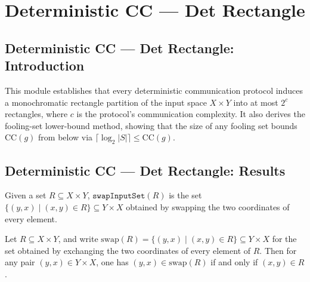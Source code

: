\section{Deterministic CC --- Det Rectangle}
\subsection*{Deterministic CC --- Det Rectangle: Introduction}

This module establishes that every deterministic communication protocol induces a
monochromatic rectangle partition of the input space $X \times Y$ into at most
$2^c$ rectangles, where $c$ is the protocol's communication complexity.
It also derives the fooling-set lower-bound method, showing that the size of any
fooling set bounds $\mathrm{CC}(g)$ from below via $\lceil \log_2 |S| \rceil \leq \mathrm{CC}(g)$.

\subsection*{Deterministic CC --- Det Rectangle: Results}

\begin{definition}
\label{CommunicationComplexity.Deterministic.Protocol.swapInputSet}
\leanok
Given a set $R \subseteq X \times Y$, $\texttt{swapInputSet}(R)$ is the set
$\{(y, x) \mid (x, y) \in R\} \subseteq Y \times X$ obtained by swapping the two
coordinates of every element.
\end{definition}

\begin{theorem}
\label{CommunicationComplexity.Deterministic.Protocol.mem_swapInputSet}
\leanok
{}
Let $R \subseteq X \times Y$, and write $\mathrm{swap}(R) = \{(y,x) \mid (x,y) \in R\}
\subseteq Y \times X$ for the set obtained by exchanging the two coordinates of every
element of $R$. Then for any pair $(y, x) \in Y \times X$, one has $(y, x) \in
\mathrm{swap}(R)$ if and only if $(x, y) \in R$.
\end{theorem}

